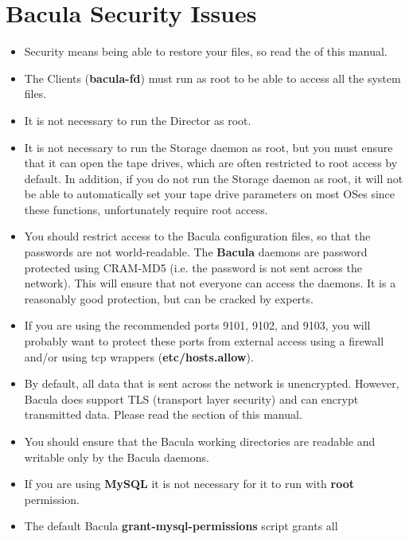 
\chapter{Bacula Security Issues}
\label{SecurityChapter}

\begin{itemize}
\item Security means being able to restore your files, so read the 
    of this manual.
\item The Clients ({\bf bacula-fd}) must run as root to be able to access  all
   the system files. 
\item It is not necessary to run the Director as root. 
\item It is not necessary to run the Storage daemon as root, but you  must
   ensure that it can open the tape drives, which are often restricted to root
   access by default. In addition, if you do not run the Storage daemon as root,
   it will not be able to automatically set your tape drive parameters on most
   OSes since these functions, unfortunately require root access.
\item You should restrict access to the Bacula configuration files,  so that
   the passwords are not world-readable. The {\bf Bacula}  daemons are password
   protected using CRAM-MD5 (i.e. the password is not  sent across the network).
   This will ensure that not everyone  can access the daemons. It is a reasonably
   good protection, but  can be cracked by experts. 
\item If you are using the recommended ports 9101, 9102, and 9103, you  will
   probably want to protect these ports from external access  using a firewall
   and/or using tcp wrappers ({\bf etc/hosts.allow}).  
\item By default, all data that is sent across the network is unencrypted.
   However, Bacula does support TLS (transport layer security) and can
   encrypt transmitted data.  Please read the
   section of this manual.
\item You should ensure that the Bacula working directories are  readable and
   writable only by the Bacula daemons. 
\item If you are using {\bf MySQL} it is not necessary for it to  run with
   {\bf root} permission. 
\item The default Bacula {\bf grant-mysql-permissions} script  grants all

\end{itemize}
